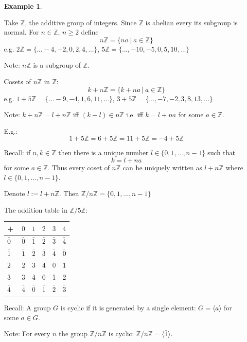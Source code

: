 \documentclass[12pt, letterpaper, oneside]{article}
\theoremstyle{plain}
\theoremstyle{definition}
\newtheorem{example}[theorem]{Example}
\newcommand{\Z}{{\mathbb Z}}
\newcommand{\subgp}[1]{\langle#1\rangle}
\begin{document}
\begin{example}\ 

Take $\Z$, the additive group of integers. Since $\Z$ is abelian every its subgroup is normal. 
For $n\in \Z$, $n\geq 2$ define
$$n\Z = \{ na \ | \ a \in \Z \}$$
e.g. $2\Z= \{\dots -4, -2, 0, 2, 4, \dots\}$, $5\Z = \{\dots , -10, -5, 0, 5, 10, \dots \}$

Note: $n\Z$ is a subgroup of $\Z$.

Cosets of $n\Z$ in $\Z$:
$$k+n\Z = \{ k+na \ | \ a\in \Z \}$$
e.g. $1+ 5\Z= \{\dots -9, -4, 1, 6, 11, \dots\}$, $3+5\Z = \{\dots , -7, -2, 3, 8, 13, \dots \}$

Note: $k+n\Z = l+ n\Z$ iff $(k-l) \in n\Z$ i.e. iff $k = l+ na$ for some $a\in \Z$. 

E.g.: 
$$1 + 5\Z = 6 + 5\Z = 11 + 5\Z = -4+5\Z$$

Recall:  if $n, k\in \Z$ then there is a unique number $l\in\{0, 1, \dots, n-1 \}$ such that 
$$k = l+ na $$
for some $a\in \Z$. Thus every coset of $n\Z$ can be uniquely written as 
$l+n\Z$ where $l\in \{0, 1, \dots, n-1\}$.


Denote $\bar{l} := l+n\Z$. Then 
$\Z/n\Z = \{\bar{0}, \bar{1}, \dots, \overline{n-1}\}$

The addition table in $\Z/5\Z$:

\begin{center}
\begin{tabular}{b{3mm} |b{3mm} b{3mm} b{3mm} b{3mm} b{3mm} }
+                &  $\ \bar{0}$ &  $\bar{1}$  &  $\bar{2}$ &  $\bar{3}$ &  $\bar{4}$ \\ \midrule
$\bar{0}$  &  $\ \bar{0}$ &  $\bar{1}$  &  $\bar{2}$ &  $\bar{3}$ &  $\bar{4}$ \\[3pt] 
$\bar{1}$  &  $\ \bar{1}$ &  $\bar{2}$  &  $\bar{3}$ &  $\bar{4}$ &  $\bar{0}$ \\[3pt]  
$\bar{2}$  &  $\ \bar{2}$ &  $\bar{3}$  &  $\bar{4}$ &  $\bar{0}$ &  $\bar{1}$ \\[3pt]  
$\bar{3}$  &  $\ \bar{3}$ &  $\bar{4}$  &  $\bar{0}$ &  $\bar{1}$ &  $\bar{2}$ \\[3pt]   
$\bar{4}$  &  $\ \bar{4}$ &  $\bar{0}$  &  $\bar{1}$ &  $\bar{2}$ &  $\bar{3}$ \\[3pt]  
\end{tabular}
\end{center}


Recall: A group $G$ is cyclic if it is generated by a single element: $G=\subgp{a}$ for some 
$a\in G$. 

Note: For every $n$ the group $\Z/n\Z$ is cyclic: $\Z/n\Z = \subgp{\bar{1}}$. 

\end{example}
\end{document}
